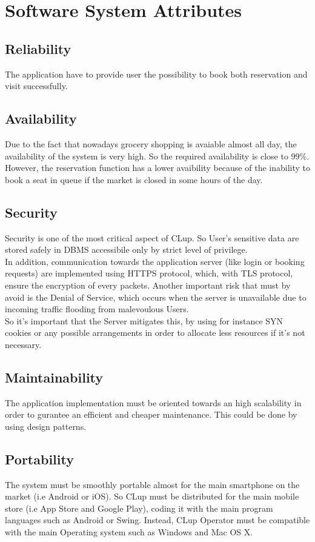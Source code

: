 \bigskip
\par
\section{Software System Attributes}
\subsection{Reliability}
The application have to provide user the possibility to book both reservation and visit successfully. 
\subsection{Availability}
Due to the fact that nowadays grocery shopping is avaiable almost all day, the availability of the system is very high. So the required availability is close to 99\%. \\
However, the reservation function has a lower avaibility because of the inability to book a seat in queue if the market is closed in some hours of the day. 
\subsection{Security}
Security is one of the most critical aspect of CLup. So User's sensitive data are stored safely in DBMS accessibile only by strict level of privilege.\\ 
In addition, communication towards the application server (like login or booking requests) are implemented using  HTTPS protocol, which, with TLS protocol, ensure the encryption of every packets. Another important risk that must by avoid is the Denial of Service, which occurs when the server is unavailable due to incoming traffic flooding from malevoulous Users.\\
So it's important that the Server mitigates this, by using for instance SYN cookies or any possible arrangements in order to allocate less resources if it's not necessary.
\subsection{Maintainability}
The application implementation must be oriented towards an high scalability in order to gurantee an efficient and cheaper maintenance. This could be done by using design patterns.
\subsection{Portability}
The system must be smoothly portable almost for the main smartphone on the market (i.e Android or iOS). So CLup must be distributed for the main mobile store (i.e App Store and Google Play), coding it with the main program languages such as Android or Swing. Instead, CLup Operator
must be compatible with the main Operating system such as Windows and Mac OS X. 